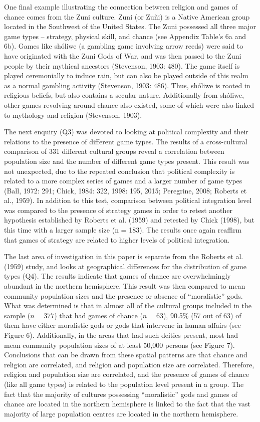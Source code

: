 \documentclass[%
	]{ijsra}
\begin{document}
One final example illustrating the connection between religion and games of chance comes from the Zuni culture. Zuni (or Zuñi) is a Native American group located in the Southwest of the United States. The Zuni possessed all three major game types – strategy, physical skill, and chance (see Appendix Table’s 6a and 6b). Games like shóliwe (a gambling game involving arrow reeds) were said to have originated with the Zuni Gods of War, and was then passed to the Zuni people by their mythical ancestors (Stevenson, 1903: 480). The game itself is played ceremonially to induce rain, but can also be played outside of this realm as a normal gambling activity (Stevenson, 1903: 486). Thus, shóliwe is rooted in religious beliefs, but also contains a secular nature. Additionally from shóliwe, other games revolving around chance also existed, some of which were also linked to mythology and religion (Stevenson, 1903). 

The next enquiry (Q3) was devoted to looking at political complexity and their relations to the presence of different game types. The results of a cross-cultural comparison of 331 different cultural groups reveal a correlation between population size and the number of different game types present. This result was not unexpected, due to the repeated conclusion that political complexity is related to a more complex series of games and a larger number of game types (Ball, 1972: 291; Chick, 1984: 322, 1998: 195, 2015; Peregrine, 2008; Roberts et al., 1959). In addition to this test, comparison between political integration level was compared to the presence of strategy games in order to retest another hypothesis established by Roberts et al. (1959) and retested by Chick (1998), but this time with a larger sample size (n = 183). The results once again reaffirm that games of strategy are related to higher levels of political integration. %

The last area of investigation in this paper is separate from the Roberts et al. (1959) study, and looks at geographical differences for the distribution of game types (Q4). The results indicate that games of chance are overwhelmingly abundant in the northern hemisphere. This result was then compared to mean community population sizes and the presence or absence of “moralistic” gods. What was determined is that in almost all of the cultural groups included in the sample ($n = 377$) that had games of chance ($n = 63$), 90.5\% (57 out of 63) of them have either moralistic gods or gods that intervene in human affairs (see Figure 6). Additionally, in the areas that had such deities present, most had mean community population sizes of at least 50,000 persons (see Figure 7). Conclusions that can be drawn from these spatial patterns are that chance and religion are correlated, and religion and population size are correlated. Therefore, religion and population size are correlated, and the presence of games of chance (like all game types) is related to the population level present in a group. The fact that the majority of cultures possessing “moralistic” gods and games of chance are located in the northern hemisphere is linked to the fact that the vast majority of large population centres are located in the northern hemisphere.
\end{document}
